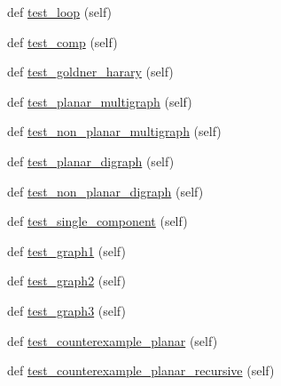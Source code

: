 \begin{DoxyCompactItemize}
def \hyperlink{classnetworkx_1_1algorithms_1_1tests_1_1test__planarity_1_1TestLRPlanarity_a7ec9376f565c7ccd2dfd409502a8bd6e}{test\+\_\+loop} (self)
\item 
def \hyperlink{classnetworkx_1_1algorithms_1_1tests_1_1test__planarity_1_1TestLRPlanarity_aaac478615458f1b09df79c02c7a067d6}{test\+\_\+comp} (self)
\item 
def \hyperlink{classnetworkx_1_1algorithms_1_1tests_1_1test__planarity_1_1TestLRPlanarity_ab00bed4a2fbdfd9fb92f1a95fb6d7c51}{test\+\_\+goldner\+\_\+harary} (self)
\item 
def \hyperlink{classnetworkx_1_1algorithms_1_1tests_1_1test__planarity_1_1TestLRPlanarity_a6c4a97e167c02f4942aed4fb57581b79}{test\+\_\+planar\+\_\+multigraph} (self)
\item 
def \hyperlink{classnetworkx_1_1algorithms_1_1tests_1_1test__planarity_1_1TestLRPlanarity_a1b6afdd5e854bc08c569efb91aea45e2}{test\+\_\+non\+\_\+planar\+\_\+multigraph} (self)
\item 
def \hyperlink{classnetworkx_1_1algorithms_1_1tests_1_1test__planarity_1_1TestLRPlanarity_ac50ae59a44be1606725e8c47f0a6fb69}{test\+\_\+planar\+\_\+digraph} (self)
\item 
def \hyperlink{classnetworkx_1_1algorithms_1_1tests_1_1test__planarity_1_1TestLRPlanarity_ab2edf282b2a70d090cf7ad84c1cb10cb}{test\+\_\+non\+\_\+planar\+\_\+digraph} (self)
\item 
def \hyperlink{classnetworkx_1_1algorithms_1_1tests_1_1test__planarity_1_1TestLRPlanarity_a05174e409c75b4fd0321688c1b40efb1}{test\+\_\+single\+\_\+component} (self)
\item 
def \hyperlink{classnetworkx_1_1algorithms_1_1tests_1_1test__planarity_1_1TestLRPlanarity_a0230b2770b3cb913a9d011dc131fcb93}{test\+\_\+graph1} (self)
\item 
def \hyperlink{classnetworkx_1_1algorithms_1_1tests_1_1test__planarity_1_1TestLRPlanarity_a907fa40d16bdb9acc2727855d2c533f2}{test\+\_\+graph2} (self)
\item 
def \hyperlink{classnetworkx_1_1algorithms_1_1tests_1_1test__planarity_1_1TestLRPlanarity_a2b3a2f4b836e56cf91c4a772381a73b8}{test\+\_\+graph3} (self)
\item 
def \hyperlink{classnetworkx_1_1algorithms_1_1tests_1_1test__planarity_1_1TestLRPlanarity_aa1f0ff96e75f89f25800de6ad9e0b360}{test\+\_\+counterexample\+\_\+planar} (self)
\item 
def \hyperlink{classnetworkx_1_1algorithms_1_1tests_1_1test__planarity_1_1TestLRPlanarity_a84872cef801342d151a9eac46e6abd4b}{test\+\_\+counterexample\+\_\+planar\+\_\+recursive} (self)
\end{DoxyCompactItemize}
